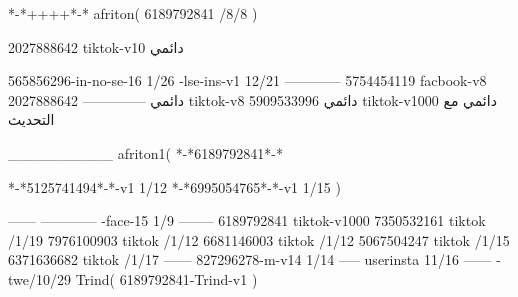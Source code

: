 *-*++++*-*
afriton(
6189792841 /8/8
)

2027888642 tiktok-v10
دائمي

565856296-in-no-se-16 1/26
-lse-ins-v1 12/21
------------
5754454119 facbook-v8
دائمي
--------------
2027888642 tiktok-v8
دائمي
5909533996 tiktok-v1000
دائمي مع التحديث

__________
afriton1(
*-*6189792841*-*


*-*5125741494*-*-v1 1/12
*-*6995054765*-*-v1 1/15
)

------
------------
-face-15 1/9
--------
6189792841 tiktok-v1000
7350532161 tiktok /1/19
7976100903 tiktok /1/12
6681146003 tiktok /1/12
5067504247 tiktok /1/15
6371636682 tiktok /1/17
------
827296278-m-v14 1/14
-----
userinsta 11/16
------
-twe/10/29
Trind(
6189792841-Trind-v1 
)
